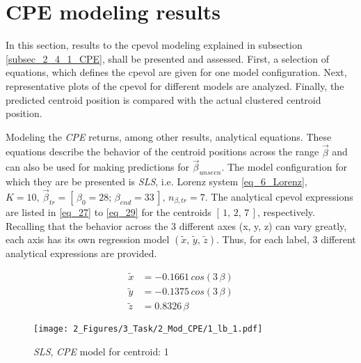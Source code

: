 \section{CPE modeling results}
\label{sec_3_2_MOD_CPE}
In this section, results to the \gls{cpevol} modeling explained in subsection \ref{subsec_2_4_1_CPE}, shall be presented and assessed.
First, a selection of equations, which defines the \gls{cpevol} are given for one model configuration.
Next, representative plots of the \gls{cpevol} for different models are analyzed.
Finally, the predicted centroid position is compared with the actual clustered centroid position.\newline 


Modeling the \emph{CPE} returns, among other results, analytical equations. 
These equations describe the behavior of the centroid positions across the range $\vec{\beta}$ and can also be used for making predictions for $\vec{\beta}_{unseen}$.
The model configuration for which they are be presented is \emph{SLS}, i.e. Lorenz system \eqref{eq_6_Lorenz}, $K= 10,\, \vec{\beta }_{tr} = [\, \beta_0 = 28 ; \, \beta_{end} =33  \,], \, n_{\beta, tr} = 7$. 
The analytical \gls{cpevol} expressions are listed in \eqref{eq_27} to \eqref{eq_29} for the centroids  $[\,1,\, 2,\,7\,]$, respectively.
Recalling that the behavior across the 3 different axes (x, y, z) can vary greatly, each axis has its own regression model $(\tilde x,\, \tilde y,\, \tilde z)$.
Thus, for each label, 3 different analytical expressions are provided. \newline


\begin{figure}[!h]
    \begin{minipage}{.47\textwidth}
      \begin{equation}
        \begin{aligned}
            \tilde x &= -0.1661 \, cos(3  \, \beta) \\
            \tilde y &=  -0.1375 \, cos(3 \,  \beta) \\
            \tilde z &=  0.8326 \, \beta 
        \end{aligned}
        \label{eq_27}
      \end{equation}
    \end{minipage}%
    \hfill
    \begin{minipage}{.47\textwidth}
        \centering
        \texttt{[image: 2\_Figures/3\_Task/2\_Mod\_CPE/1\_lb\_1.pdf]}
        \caption{\emph{SLS}, \emph{CPE} model for centroid: 1 }
        \label{fig_45}    
    \end{minipage}
\end{figure}

